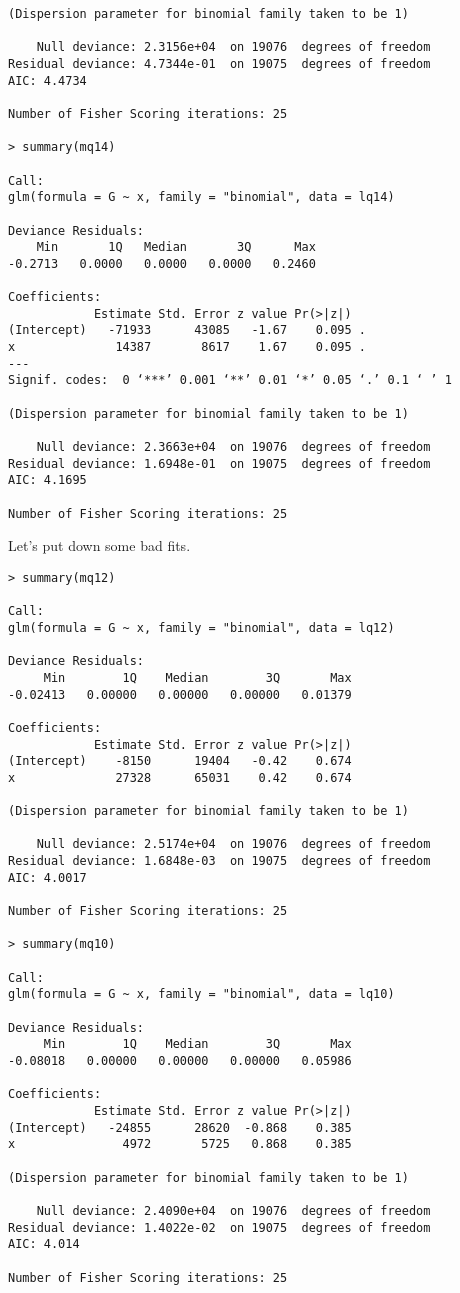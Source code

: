 \documentclass{amsart}
\begin{document}
\begin{verbatim}
(Dispersion parameter for binomial family taken to be 1)

    Null deviance: 2.3156e+04  on 19076  degrees of freedom
Residual deviance: 4.7344e-01  on 19075  degrees of freedom
AIC: 4.4734

Number of Fisher Scoring iterations: 25

> summary(mq14)

Call:
glm(formula = G ~ x, family = "binomial", data = lq14)

Deviance Residuals: 
    Min       1Q   Median       3Q      Max  
-0.2713   0.0000   0.0000   0.0000   0.2460  

Coefficients:
            Estimate Std. Error z value Pr(>|z|)  
(Intercept)   -71933      43085   -1.67    0.095 .
x              14387       8617    1.67    0.095 .
---
Signif. codes:  0 ‘***’ 0.001 ‘**’ 0.01 ‘*’ 0.05 ‘.’ 0.1 ‘ ’ 1

(Dispersion parameter for binomial family taken to be 1)

    Null deviance: 2.3663e+04  on 19076  degrees of freedom
Residual deviance: 1.6948e-01  on 19075  degrees of freedom
AIC: 4.1695

Number of Fisher Scoring iterations: 25
\end{verbatim}


Let's put down some bad fits.

\begin{verbatim}
> summary(mq12)

Call:
glm(formula = G ~ x, family = "binomial", data = lq12)

Deviance Residuals: 
     Min        1Q    Median        3Q       Max  
-0.02413   0.00000   0.00000   0.00000   0.01379  

Coefficients:
            Estimate Std. Error z value Pr(>|z|)
(Intercept)    -8150      19404   -0.42    0.674
x              27328      65031    0.42    0.674

(Dispersion parameter for binomial family taken to be 1)

    Null deviance: 2.5174e+04  on 19076  degrees of freedom
Residual deviance: 1.6848e-03  on 19075  degrees of freedom
AIC: 4.0017

Number of Fisher Scoring iterations: 25

> summary(mq10)

Call:
glm(formula = G ~ x, family = "binomial", data = lq10)

Deviance Residuals: 
     Min        1Q    Median        3Q       Max  
-0.08018   0.00000   0.00000   0.00000   0.05986  

Coefficients:
            Estimate Std. Error z value Pr(>|z|)
(Intercept)   -24855      28620  -0.868    0.385
x               4972       5725   0.868    0.385

(Dispersion parameter for binomial family taken to be 1)

    Null deviance: 2.4090e+04  on 19076  degrees of freedom
Residual deviance: 1.4022e-02  on 19075  degrees of freedom
AIC: 4.014

Number of Fisher Scoring iterations: 25

\end{verbatim}
\end{document}
